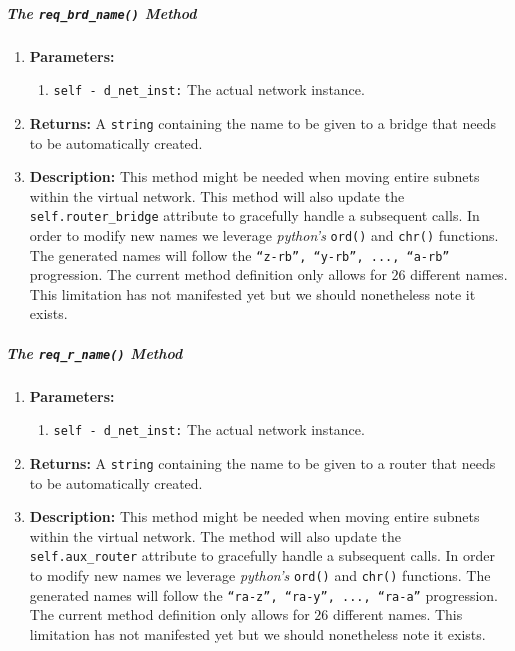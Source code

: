        \subparagraph{The \texttt{req\_brd\_name()} Method}
            \begin{enumerate}
                \item \textbf{Parameters:}
                \begin{enumerate}
                    \item \texttt{self - d\_net\_inst:} The actual network instance.
                \end{enumerate}
                \item \textbf{Returns:} A \texttt{string} containing the name to be given to a bridge that needs to be automatically created.
                \item \textbf{Description:} This method might be needed when moving entire subnets within the virtual network. This method will also update the \texttt{self.router\_bridge} attribute to gracefully handle a subsequent calls. In order to modify new names we leverage \textit{python's} \texttt{ord()} \cite{bib:python-builtins} and \texttt{chr()} \cite{bib:python-builtins} functions. The generated names will follow the \texttt{``z-rb'', ``y-rb'', ..., ``a-rb''} progression. The current method definition only allows for $26$ different names. This limitation has not manifested yet but we should nonetheless note it exists.
            \end{enumerate}

        \subparagraph{The \texttt{req\_r\_name()} Method}
            \begin{enumerate}
                \item \textbf{Parameters:}
                \begin{enumerate}
                    \item \texttt{self - d\_net\_inst:} The actual network instance.
                \end{enumerate}
                \item \textbf{Returns:} A \texttt{string} containing the name to be given to a router that needs to be automatically created.
                \item \textbf{Description:} This method might be needed when moving entire subnets within the virtual network. The method will also update the \texttt{self.aux\_router} attribute to gracefully handle a subsequent calls. In order to modify new names we leverage \textit{python's} \texttt{ord()} \cite{bib:python-builtins} and \texttt{chr()} \cite{bib:python-builtins} functions. The generated names will follow the \texttt{``ra-z'', ``ra-y'', ..., ``ra-a''} progression. The current method definition only allows for $26$ different names. This limitation has not manifested yet but we should nonetheless note it exists.
            \end{enumerate}

